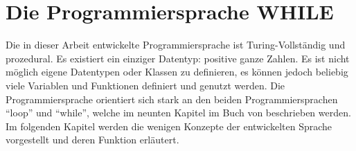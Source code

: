 \chapter{Die Programmiersprache WHILE} \label{chap:while}

Die in dieser Arbeit entwickelte Programmiersprache ist Turing-Vollständig und prozedural. Es existiert ein einziger Datentyp: positive ganze Zahlen. Es ist nicht möglich eigene Datentypen oder Klassen zu definieren, es können jedoch beliebig viele Variablen und Funktionen definiert und genutzt werden. Die Programmiersprache orientiert sich stark an den beiden Programmiersprachen \enquote{loop} und \enquote{while}, welche im neunten Kapitel im Buch  von \citeauthor{GottfriedVossen2016} beschrieben werden. \cite{GottfriedVossen2016} Im folgenden Kapitel werden die wenigen Konzepte der entwickelten Sprache vorgestellt und deren Funktion erläutert.


